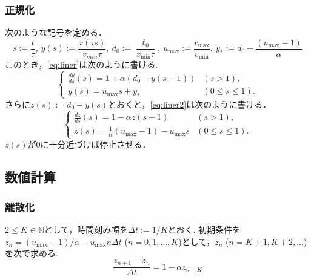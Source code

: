 \documentclass [dvipdfmx] {jsarticle}
\numberwithin{equation}{section}
\theoremstyle{definition} %
\theoremstyle{definition} %
\begin{document}
\subsubsection{正規化}
次のような記号を定める．
\begin{equation}
    s:=\displaystyle\frac{t}{\tau},\ y(s):=\displaystyle\frac{x(\tau s)}{v_{min}\tau},\
    d_0:=\frac{\ell_0}{v_{\min}\tau},\ u_{\max}:=\displaystyle\frac{v_{\max}}{v_{\min}},\ 
    y_\ast:=d_0-\displaystyle\frac{(u_{\max}-1)}{\alpha}
\end{equation}
このとき，\eqref{eq:liner}は次のように書ける.
\begin{equation}\label{eq:liner2}\begin{cases}
    \displaystyle\frac{dy}{ds}(s)=1+\alpha(d_0-y(s-1)) &(s>1),\\
    y(s)=u_{\max}s+y_\ast &(0\le s \le 1).
\end{cases}\end{equation}
さらに$z(s):=d_0-y(s)$とおくと，\eqref{eq:liner2}は次のように書ける．
\begin{equation}\label{z_press}\begin{cases}
    \displaystyle\frac{dz}{ds}(s)=1-\alpha z(s-1) &(s>1),\\
    z(s)=\displaystyle\frac{1}{\alpha}(u_{\max}-1)-u_{\max}s &(0\le s\le 1).
\end{cases}\end{equation}
$z(s)$が$0$に十分近づけば停止させる．


\subsection{数値計算}
\subsubsection{離散化}
$2\le K\in\mathbb{N}$として，時間刻み幅を$\Delta t:=1/K$とおく.
初期条件を$z_n=(u_{\max}-1)/\alpha-u_{\max} n \Delta t$ ($n=0,1,...,K$)として，$z_n$ ($n=K+1,K+2,...$)
を次で求める.
\begin{equation}\label{z_method}
    \displaystyle\frac{z_{n+1}-z_n}{\Delta t}=1-\alpha z_{n-K}
\end{equation}
\end{document}
